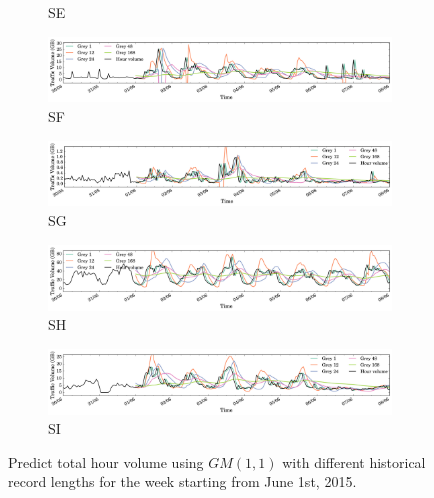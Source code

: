 \begin{figure}
\begin{subfigure}[b]{0.9\textwidth}
                \caption{SE}
                \label{fig:grey_se}
        \end{subfigure}
        \begin{subfigure}[b]{0.9\textwidth}
                \includegraphics[width=\textwidth]{gfx/chap2/grey_sf.png}
                \caption{SF}
                \label{fig:grey_sf}
        \end{subfigure}
        \begin{subfigure}[b]{0.9\textwidth}
                \includegraphics[width=\textwidth]{gfx/chap2/grey_sg.png}
                \caption{SG}
                \label{fig:grey_sg}
        \end{subfigure}
        \begin{subfigure}[b]{0.9\textwidth}
                \includegraphics[width=\textwidth]{gfx/chap2/grey_sh.png}
                \caption{SH}
                \label{fig:grey_sh}
        \end{subfigure}
        \begin{subfigure}[b]{0.9\textwidth}
                \includegraphics[width=\textwidth]{gfx/chap2/grey_si.png}
                \caption{SI}
                \label{fig:grey_si}
        \end{subfigure}
\caption{Predict total hour volume using $GM(1,1)$ with different historical record lengths for the week starting from June 1st, 2015.}
\label{fig:grey}
\end{figure}

